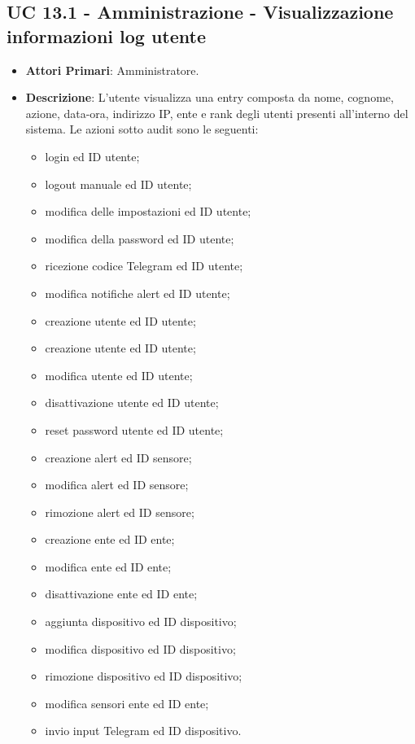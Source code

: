 		\subsection{UC 13.1 - Amministrazione - Visualizzazione informazioni log utente}
		\begin{itemize}
			\item \textbf{Attori Primari}: Amministratore.
			\item \textbf{Descrizione}: L'utente visualizza una entry composta da nome, cognome, azione, data-ora, indirizzo IP, ente e rank degli utenti presenti all'interno del sistema.
			Le azioni sotto audit sono le seguenti: 
			
			\begin{itemize}
				\item login ed ID utente;
				\item logout manuale ed ID utente;
				\item modifica delle impostazioni ed ID utente;
				\item modifica della password ed ID utente;
				\item ricezione codice Telegram ed ID utente;
				\item modifica notifiche alert ed ID utente;
				\item creazione utente ed ID utente;
				\item creazione utente ed ID utente;
				\item modifica utente ed ID utente;
				\item disattivazione utente ed ID utente;
				\item reset password utente ed ID utente;
				\item creazione alert ed ID sensore;
				\item modifica alert ed ID sensore;
				\item rimozione alert ed ID sensore;
				\item creazione ente ed ID ente;
				\item modifica ente ed ID ente;
				\item disattivazione ente ed ID ente;
				\item aggiunta dispositivo ed ID dispositivo;
				\item modifica dispositivo ed ID dispositivo;
				\item rimozione dispositivo ed ID dispositivo;
				\item modifica sensori ente ed ID ente;
				\item invio input Telegram ed ID dispositivo.
			\end{itemize}
			

\end{itemize}
